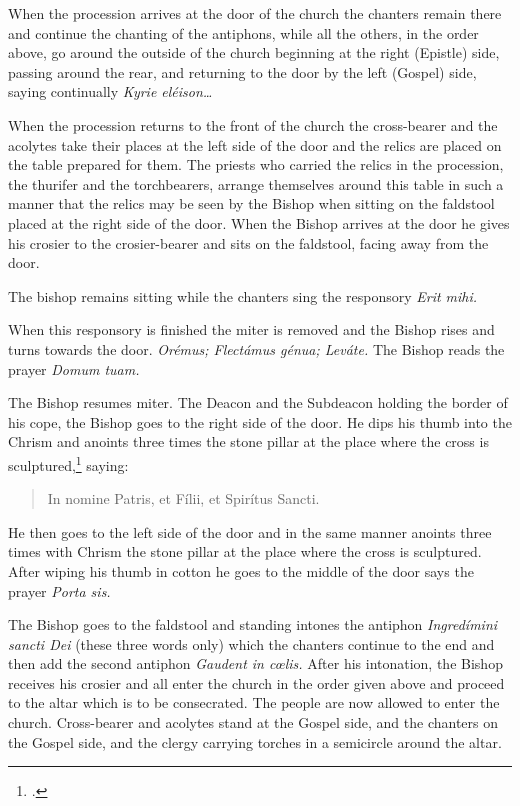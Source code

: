\documentclass[letterpaper]{report}
\newcommand\src{\textsc{S.R.C.}}
\begin{document}
{    When the procession arrives at the door of the church the chanters remain
    there and continue the chanting of the antiphons, while all the others, in
    the order above, go around the outside of the church beginning at the right
    (Epistle) side, passing around the rear, and returning to the door by the
    left (Gospel) side, saying continually \textit{Kyrie eléison\dots}

    \rubric When the procession returns to the front of the church the
    cross-bearer and the acolytes take their places at the left side of the
    door and the relics are placed on the table prepared for them. The priests
    who carried the relics in the procession, the thurifer and the
    torchbearers, arrange themselves around this table in such a manner that
    the relics may be seen by the Bishop when sitting on the faldstool placed
    at the right side of the door. When the Bishop arrives at the door he gives
    his crosier to the crosier-bearer and sits on the faldstool, facing away
    from the door.

    \rubric The bishop remains sitting while the chanters sing the responsory
    \textit{Erit mihi.}

    \rubric When this responsory is finished the miter is removed and the
    Bishop rises and turns towards the door. \textit{Orémus; Flectámus génua;
    Leváte.} The Bishop reads the prayer \textit{Domum tuam.}

    \rubric The Bishop resumes miter. The Deacon and the Subdeacon holding the
    border of his cope, the Bishop goes to the right side of the door. He dips
    his thumb into the Chrism and anoints three times the stone pillar at the
    place where the cross is sculptured,\footcite[The Pontifical says
    ''\textit{signat ostium,''} which the \src, Aug. 7, 1875, n. 3364 ad VI,
    interprets to mean the two stone or brick pillars at the sides of the
    door.][footnote 1, p. 83.]{consecranda} saying:

    \begin{quote}
       In nomine Pa\cross tris, et Fí\cross lii, et Spirítus \cross Sancti.
    \end{quote}

    He then goes to the left side of the door and in the same manner anoints three
    times with Chrism the stone pillar at the place where the cross is sculptured.
    After wiping his thumb in cotton he goes to the middle of the door says the
    prayer \textit{Porta sis.}

    \rubric The Bishop goes to the faldstool and standing intones the antiphon
    \textit{Ingred\'imini sancti Dei} (these three words only) which the
    chanters continue to the end and then add the second antiphon
    \textit{Gaudent in c\oe lis.} After his intonation, the Bishop receives his
    crosier and all enter the church in the order given above and proceed to
    the altar which is to be consecrated. The people are now allowed to enter
    the church. Cross-bearer and acolytes stand at the Gospel side, and the
    chanters on the Gospel side, and the clergy carrying torches
    in a semicircle around the altar. 

}
\end{document}
